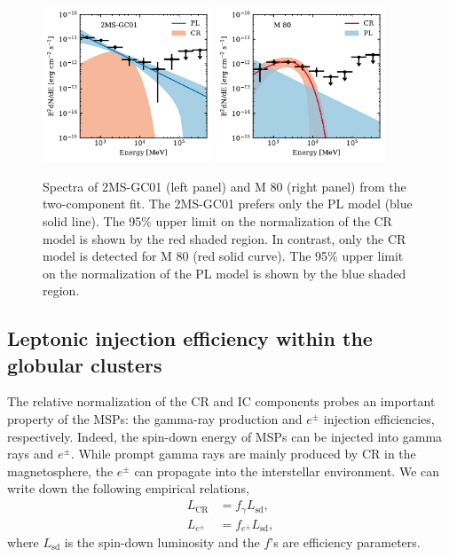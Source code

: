 \documentclass[doublespace,nopageskip]{VTthesis}
\begin{document}
\begin{figure}[htb]
    \centering
    \includegraphics[width=0.45\textwidth]{Figures/Globular/spectra/2comp_0.pdf}
    \includegraphics[width=0.45\textwidth]{Figures/Globular/spectra/2comp_8.pdf}
    \caption{Spectra of 2MS-GC01 (left panel) and M 80 (right panel) from the two-component fit. The 2MS-GC01 prefers only the {PL} model (blue solid line). The 95\% upper limit on the normalization of the CR model is shown by the red shaded region. In contrast, only the CR model is detected for M 80 (red solid curve). The 95\% upper limit on the normalization of the {PL} model is shown by the blue shaded region.}
    \label{fig:global_spectra_ul}
\end{figure}

\subsection{Leptonic injection efficiency within the globular clusters}\label{spectra_fe}

The relative normalization of the CR and IC components probes an important property of the MSPs: the gamma-ray production and $e^\pm$ injection efficiencies, respectively. Indeed, the spin-down energy of MSPs can be injected into gamma rays and $e^\pm$. While prompt gamma rays are mainly produced by CR in the magnetosphere, the $e^\pm$ can propagate into the interstellar environment. We can write down the following empirical relations,
\begin{align}
    L_\mathrm{CR} &= f_\gamma L_\mathrm{sd},\\
    L_{e^\pm} &= f_{e^\pm} L_\mathrm{sd},
\end{align}
where $L_\mathrm{sd}$ is the spin-down luminosity and the $f$'s are efficiency parameters. 
\end{document}

